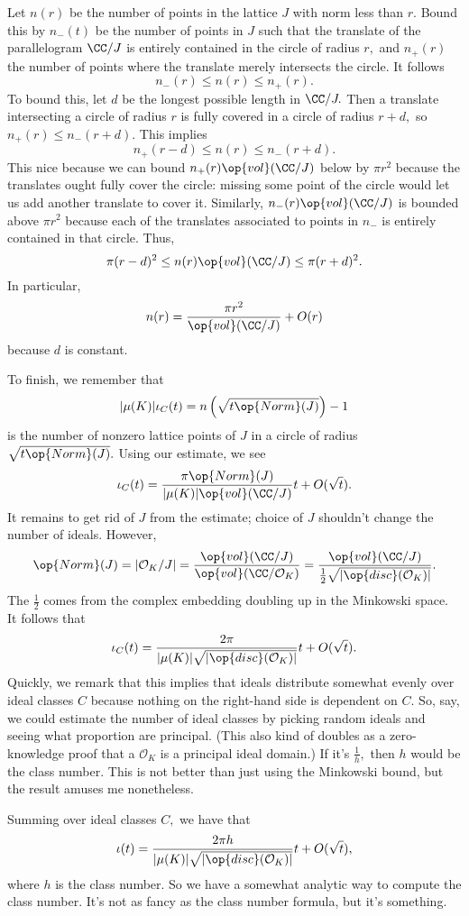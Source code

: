 Let $n(r)$ be the number of points in the lattice $J$ with norm less than $r.$ Bound this by $n_-(t)$ be the number of points in $J$ such that the translate of the parallelogram $\CC/J$ is entirely contained in the circle of radius $r,$ and $n_+(r)$ the number of points where the translate merely intersects the circle. It follows
\[n_-(r)\le n(r)\le n_+(r).\]
To bound this, let $d$ be the longest possible length in $\CC/J.$ Then a translate intersecting a circle of radius $r$ is fully covered in a circle of radius $r+d,$ so $n_+(r)\le n_-(r+d).$ This implies
\[n_+(r-d)\le n(r)\le n_-(r+d).\]
This nice because we can bound $n_+(r)\op{vol}(\CC/J)$ below by $\pi r^2$ because the translates ought fully cover the circle: missing some point of the circle would let us add another translate to cover it. Similarly, $n_-(r)\op{vol}(\CC/J)$ is bounded above $\pi r^2$ because each of the translates associated to points in $n_-$ is entirely contained in that circle. Thus,
\[\pi(r-d)^2\le n(r)\op{vol}(\CC/J)\le\pi(r+d)^2.\]
In particular,
\[n(r)=\frac{\pi r^2}{\op{vol}(\CC/J)}+O(r)\]
because $d$ is constant.

To finish, we remember that
\[|\mu(K)|\iota_C(t)=n\left(\sqrt{t\op{Norm}(J)}\right)-1\]
is the number of nonzero lattice points of $J$ in a circle of radius $\sqrt{t\op{Norm}(J)}.$ Using our estimate, we see
\[\iota_C(t)=\frac{\pi\op{Norm}(J)}{|\mu(K)|\op{vol}(\CC/J)}t+O(\sqrt t).\]
It remains to get rid of $J$ from the estimate; choice of $J$ shouldn't change the number of ideals. However,
\[\op{Norm}(J)=|\mathcal O_K/J|=\frac{\op{vol}(\CC/J)}{\op{vol}(\CC/\mathcal O_K)}=\frac{\op{vol}(\CC/J)}{\frac12\sqrt{|\op{disc}(\mathcal O_K)|}}.\]
The $\frac12$ comes from the complex embedding doubling up in the Minkowski space. It follows that
\[\iota_C(t)=\frac{2\pi}{|\mu(K)|\sqrt{|\op{disc}(\mathcal O_K)|}}t+O(\sqrt t).\]
Quickly, we remark that this implies that ideals distribute somewhat evenly over ideal classes $C$ because nothing on the right-hand side is dependent on $C.$ So, say, we could estimate the number of ideal classes by picking random ideals and seeing what proportion are principal. (This also kind of doubles as a zero-knowledge proof that a $\mathcal O_K$ is a principal ideal domain.) If it's $\frac1h,$ then $h$ would be the class number. This is not better than just using the Minkowski bound, but the result amuses me nonetheless.

Summing over ideal classes $C,$ we have that
\[\iota(t)=\frac{2\pi h}{|\mu(K)|\sqrt{|\op{disc}(\mathcal O_K)|}}t+O(\sqrt t),\]
where $h$ is the class number. So we have a somewhat analytic way to compute the class number. It's not as fancy as the class number formula, but it's something.

